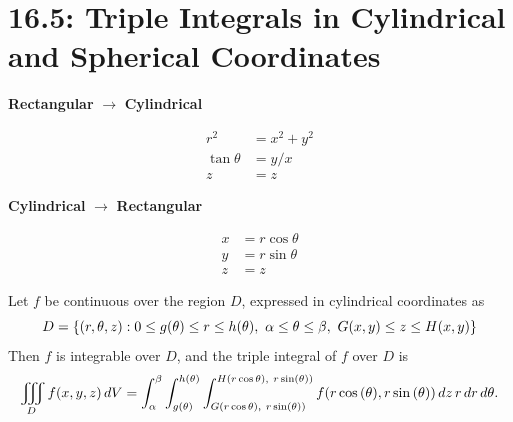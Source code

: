 \documentclass[mathNotesPreamble]{subfiles}
\begin{document}
\section{16.5: Triple Integrals in Cylindrical and Spherical Coordinates}

  \begin{thmBox*}
    \vspace*{0.5\baselineskip}
    \begin{minipage}{0.5\linewidth}
      \begin{center}
        \textbf{Rectangular} $\rightarrow$ \textbf{Cylindrical}
      \end{center}
      \begin{align*}
        r^2&=x^2+y^2\\
        \tan\theta&=y/x\\
        z&=z
      \end{align*}
    \end{minipage}%
    \begin{minipage}{0.5\linewidth}
      \begin{center}
        \textbf{Cylindrical} $\rightarrow$ \textbf{Rectangular}
      \end{center}
      \begin{align*}
        x&=r\cos\theta\\
        y&=r\sin\theta\\
        z&=z
      \end{align*}
    \end{minipage}%
  \end{thmBox*}

  \begin{thmBox*}
    Let $f$ be continuous over the region $D$, expressed in cylindrical coordinates as
      \[D={\left\{(r,\theta,z): 0\leq g(\theta)\leq r\leq h(\theta),\ \alpha\leq \theta\leq \beta,\ G(x,y)\leq z\leq H(x,y)\right\}}\]
    Then $f$ is integrable over $D$, and the triple integral of $f$ over $D$ is
      \[\iiint\limits_D f(x,y,z)\,dV=\int_\alpha^\beta \int_{g(\theta)}^{h(\theta)}\int_{G\parens{r\cos\theta),\ r\sin(\theta)}}^{H\parens{r\cos\theta),\ r\sin(\theta)}}f\parens{r\cos\parens{\theta}, r\sin\parens{\theta}}\,dz\,r\,dr\,d\theta.\]
  \end{thmBox*}
\end{document}
